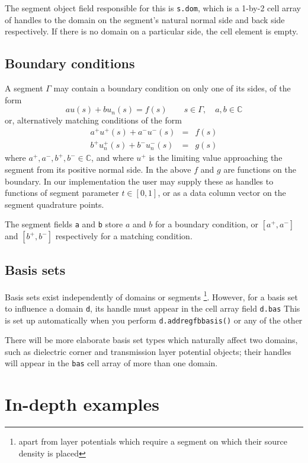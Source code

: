 \documentclass[12pt]{article}
\newcommand{\bea}{\begin{eqnarray}}
\newcommand{\eea}{\end{eqnarray}}
\begin{document}
The segment object field responsible for
this is {\tt s.dom}, which is a 1-by-2 cell array
of handles to the domain on the segment's natural normal side and
back side respectively. If there is no domain on a particular side, the
cell element is empty.


\subsection{Boundary conditions}

A segment $\Gamma$ may contain a boundary condition on only one of its sides,
of the form
$$
a u(s) + b u_n(s) = f(s)  \qquad s\in\Gamma, \quad a,b \in \mathbb{C}
$$
or, alternatively matching conditions of the form
\bea
a^+ u^+(s) + a^- u^-(s) &=& f(s)\\
b^+ u_n^+(s) + b^- u_n^-(s) &=& g(s)
\eea
where $a^+,a^-,b^+,b^- \in \mathbb{C}$, and where $u^+$ is the
limiting value approaching the segment from its positive normal side.
In the above $f$ and $g$ are functions on the boundary.
In our implementation the user
may supply these as handles to functions of segment parameter
$t\in[0,1]$, or as a data column vector on the segment quadrature points.

The segment fields {\tt a} and {\tt b} store
$a$ and $b$ for a boundary condition, or
$[a^+, a^-]$ and $[b^+, b^-]$
respectively for a matching condition.

\subsection{Basis sets}

Basis sets exist independently of domains or segments
\footnote{apart from layer potentials which require a segment on which
their source density is placed}.
However, for a basis set to influence a domain {\tt d}, its handle must appear
in the cell array field {\tt d.bas}
This is set up automatically when you perform {\tt d.addregfbbasis()}
or any of the other 

There will be more elaborate basis set types which naturally affect two domains,
such as dielectric corner and transmission layer potential objects;
their handles will appear in the {\tt bas} cell array of more than one domain.


\section{In-depth examples}
\end{document}

